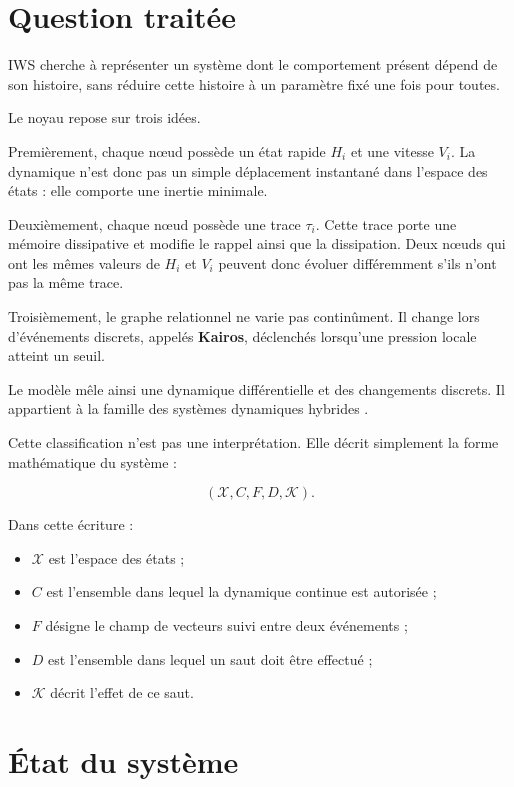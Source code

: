 \chapter{Question traitée}\label{t1-question-traitee}

IWS cherche à représenter un système dont le comportement présent dépend de son histoire, sans réduire cette histoire à un paramètre fixé une fois pour toutes.

Le noyau repose sur trois idées.

Premièrement, chaque nœud possède un état rapide \(H_i\) et une vitesse \(V_i\). La dynamique n'est donc pas un simple déplacement instantané dans l'espace des états : elle comporte une inertie minimale.

Deuxièmement, chaque nœud possède une trace \(\tau_i\). Cette trace porte une mémoire dissipative et modifie le rappel ainsi que la dissipation. Deux nœuds qui ont les mêmes valeurs de \(H_i\) et \(V_i\) peuvent donc évoluer différemment s'ils n'ont pas la même trace.

Troisièmement, le graphe relationnel ne varie pas continûment. Il change lors d'événements discrets, appelés \textbf{Kairos}, déclenchés lorsqu'une pression locale atteint un seuil.

Le modèle mêle ainsi une dynamique différentielle et des changements discrets. Il appartient à la famille des systèmes dynamiques hybrides \cite{goebel2012hybrid, lakshmikantham1989impulsive}.

Cette classification n'est pas une interprétation. Elle décrit simplement la forme mathématique du système :

\[
(\mathcal X,C,F,D,\mathcal K).
\]

Dans cette écriture :

\begin{itemize}
\tightlist
\item
  \(\mathcal X\) est l'espace des états ;
\item
  \(C\) est l'ensemble dans lequel la dynamique continue est autorisée ;
\item
  \(F\) désigne le champ de vecteurs suivi entre deux événements ;
\item
  \(D\) est l'ensemble dans lequel un saut doit être effectué ;
\item
  \(\mathcal K\) décrit l'effet de ce saut.
\end{itemize}

\chapter{État du système}\label{t1-etat-du-systeme}

